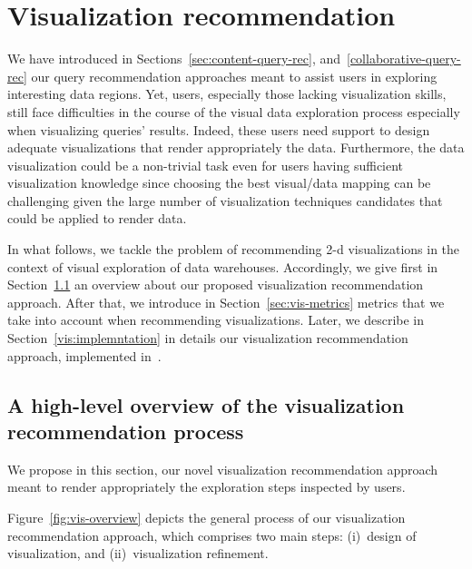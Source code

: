 \section{Visualization recommendation}
\label{sec:vis-rec}
We have introduced in Sections~\ref{sec:content-query-rec}, and~\ref{collaborative-query-rec} our query recommendation approaches meant to assist users in exploring interesting data regions.
Yet, users, especially those lacking visualization skills, still face difficulties in the course of the visual data exploration process especially when visualizing queries' results.
Indeed, these users need support to design adequate visualizations that render appropriately the data.
Furthermore, the data visualization could be a non-trivial task even for users having sufficient visualization knowledge since choosing the best visual/data mapping can be challenging given the large number of visualization techniques candidates that could be applied to render data. 


In what follows, we tackle the problem of recommending  2-d visualizations in the context of visual exploration of data warehouses.
Accordingly, we give first in Section~\ref{sec:vis-overview} an overview about our proposed visualization recommendation approach. After that, we introduce in Section~\ref{sec:vis-metrics} metrics that we take into account when recommending visualizations. Later, we describe in Section~\ref{vis:implemntation} in details our visualization recommendation approach, implemented in~\prototype{}. 



\subsection{A high-level overview of the visualization recommendation process}
\label{sec:vis-overview}



We propose in this section, our novel visualization recommendation approach meant to render appropriately the exploration steps inspected by users.

Figure~\ref{fig:vis-overview} depicts the general process of our visualization recommendation approach, 
which comprises two main steps: (i)~design of visualization, and (ii)~visualization refinement.

